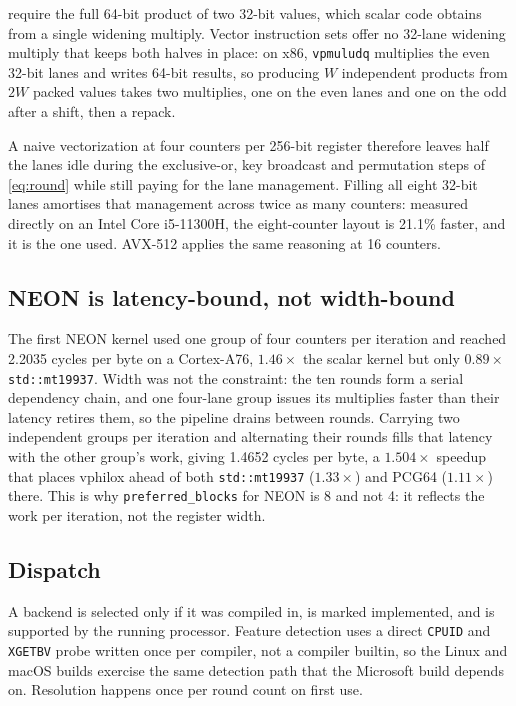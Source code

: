 \documentclass[acmsmall,screen,review]{acmart}
\theoremstyle{acmdefinition}
\newcommand{\code}[1]{\texttt{#1}}
\begin{document}
 require the full 64-bit product of two 32-bit values,
which scalar code obtains from a single widening multiply. Vector instruction
sets offer no 32-lane widening multiply that keeps both halves in place: on x86,
\code{vpmuludq} multiplies the even 32-bit lanes and writes 64-bit results, so
producing $W$ independent products from $2W$ packed values takes two multiplies,
one on the even lanes and one on the odd after a shift, then a repack.

A naive vectorization at four counters per 256-bit register therefore leaves
half the lanes idle during the exclusive-or, key broadcast and permutation steps
of \cref{eq:round} while still paying for the lane management. Filling all eight
32-bit lanes amortises that management across twice as many counters: measured
directly on an Intel Core i5-11300H, the eight-counter layout is 21.1\% faster,
and it is the one used. AVX-512 applies the same reasoning at 16 counters.

\subsection{NEON is latency-bound, not width-bound}\label{sec:neon}

The first NEON kernel used one group of four counters per iteration and reached
2.2035 cycles per byte on a Cortex-A76, $1.46\times$ the scalar kernel but only
$0.89\times$ \code{std::mt19937}. Width was not the constraint: the ten rounds
form a serial dependency chain, and one four-lane group issues its multiplies
faster than their latency retires them, so the pipeline drains between rounds.
Carrying two independent groups per iteration and alternating their rounds fills
that latency with the other group's work, giving 1.4652 cycles per byte, a
$1.504\times$ speedup that places vphilox ahead of both \code{std::mt19937}
($1.33\times$) and PCG64 ($1.11\times$) there. This is why
\code{preferred\_blocks} for NEON is 8 and not 4: it reflects the work per
iteration, not the register width.

\subsection{Dispatch}

A backend is selected only if it was compiled in, is marked implemented, and is
supported by the running processor. Feature detection uses a direct
\code{CPUID} and \code{XGETBV} probe written once per compiler, not a
compiler builtin, so the Linux and macOS builds exercise the same detection
path that the Microsoft build depends on. Resolution happens once per round
count on first use.
\end{document}
